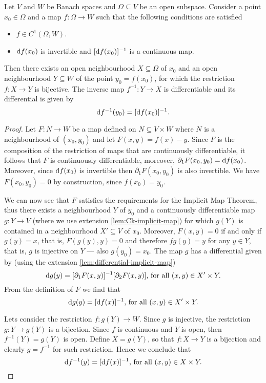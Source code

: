 \begin{theorem}
  \label{thm:inverse-map}
  Let \(V\) and \(W\) be Banach spaces and \(\Omega \subseteq V\) be an open
  subspace. Consider a point \(x_0 \in \Omega\) and a map \(f: \Omega \to W\) such that the
  following conditions are satisfied
  \begin{itemize}\setlength\itemsep{0em}
    \item \(f \in C^1(\Omega, W)\).
    \item \(\mathrm{d} f(x_0)\) is invertible and \([\mathrm{d} f(x_{0})]^{-1}\) is a
    continuous map.
  \end{itemize}
  Then there exists an open neighbourhood \(X \subseteq \Omega\) of \(x_0\) and an open
  neighbourhood \(Y \subseteq W\) of the point \(y_0 = f(x_0)\), for which the
  restriction \(f: X \to Y\) is bijective. The inverse map \(f^{-1}: Y \to X\)
  is differentiable and its differential is given by
  \[
    \mathrm{d} f^{-1}(y_0) = [\mathrm{d} f(x_{0})]^{-1}.
  \]
\end{theorem}

\begin{proof}
  Let \(F: N \to W\) be a map defined on \(N \subseteq V \times W\) where \(N\) is a
  neighbourhood of \((x_0, y_0)\) and let \(F(x, y) = f(x) - y\). Since \(F\) is
  the composition of the restriction of maps that are continuously
  differentiable, it follows that \(F\) is continuously differentiable, moreover,
  \(\partial_1F(x_0, y_0) = \mathrm{d} f(x_0)\).  Moreover, since \(\mathrm{d} f(x_0)\) is
  invertible then \(\partial_1F(x_0, y_0)\) is also invertible. We have \(F(x_0, y_0) =
  0\) by construction, since \(f(x_{0}) = y_0\).

  We can now see that \(F\) satisfies the requirements for the Implicit Map
  Theorem, thus there exists a neighbourhood \(Y\) of \(y_0\) and a
  continuously differentiable map \(g: Y \to V\) (where we use extension
  \cref{lem:Ck-implicit-map}) for which \(g(Y)\) is contained in a
  neighbourhood \(X' \subseteq V\) of \(x_{0}\). Moreover, \(F(x, y) = 0\) if and only
  if \(g(y) = x\), that is, \(F(g(y), y) = 0\) and therefore \(f g(y) = y\) for
  any \(y \in Y\), that is, \(g\) is injective on \(Y\) --- also \(g(y_0) =
  x_0\). The map \(g\) has a differential given by (using the extension
  \cref{lem:differential-implicit-map})
  \[
    \mathrm{d} g(y) = [\partial_{1} F(x, y)]^{-1} [\partial_2 F(x, y)] \text{, for all } (x, y) \in
    X' \times Y.
  \]
  From the definition of \(F\) we find that
  \[
    \mathrm{d} g(y) = [\mathrm{d} f(x)]^{-1} \text{, for all } (x, y) \in X' \times Y.
  \]

  Lets consider the restriction \(f: g(Y) \to W\). Since \(g\) is injective, the
  restriction \(g: Y \to g(Y)\) is a bijection. Since \(f\) is continuous and
  \(Y\) is open, then \(f^{-1}(Y) = g(Y)\) is open. Define \(X = g(Y)\), so that
  \(f: X \to Y\) is a bijection and clearly \(g = f^{-1}\) for such
  restriction. Hence we conclude that
  \[
    \mathrm{d} f^{-1}(y) = [\mathrm{d} f(x)]^{-1} \text{, for all } (x, y) \in X \times Y.
  \]
\end{proof}

